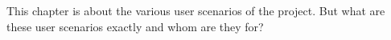 This chapter is about the various user scenarios of the project. But what are these user scenarios exactly and whom are they for?



\clearpage
